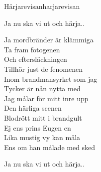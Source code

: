 \begin{song}{Härjarevisan}{harjarevisan}
\begin{vers}
Ja nu ska vi ut och härja..\\
\end{vers}
\begin{vers}
Ja mordbränder är klämmiga\\
Ta fram fotogenen\\
Och eftersläckningen\\
Tillhör just de fenomenen\\
Inom brandmansyrket som jag\\
Tycker är nån nytta med\\
Jag målar för mitt inre upp\\
Den härliga scenen\\
Blodrött mitt i brandgult\\
Ej ens prins Eugen en\\
Lika mustig vy kan måla\\
Ens om han målade med sked\\
\end{vers}
\begin{vers}
Ja nu ska vi ut och härja..\\
\end{vers}
\end{song}

